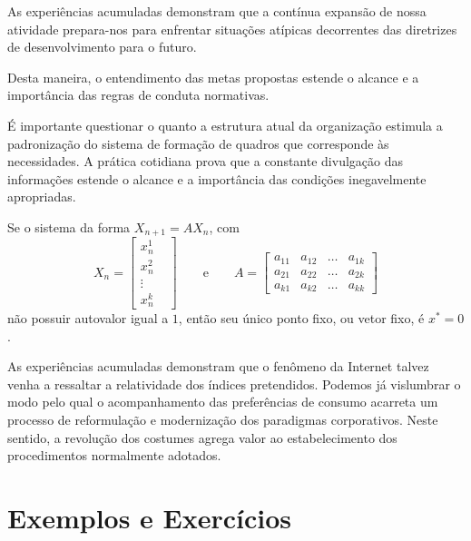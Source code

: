 \documentclass[fleqn]{icat-ufal}
\begin{document}
\begin{corolario}
  As experiências acumuladas demonstram que a contínua expansão de nossa
  atividade prepara-nos para enfrentar situações atípicas decorrentes das
  diretrizes de desenvolvimento para o futuro.
\end{corolario}

\begin{corolario}
  Desta maneira, o entendimento das metas propostas estende o alcance e a
  importância das regras de conduta normativas.
\end{corolario}

É importante questionar o quanto a estrutura atual da organização estimula a
padronização do sistema de formação de quadros que corresponde às necessidades.
A prática cotidiana prova que a constante divulgação das informações estende o
alcance e a importância das condições inegavelmente apropriadas. 

\begin{teorema}
    Se o sistema da forma $X_{n+1}=AX_n$, com 
    \[ X_n= \left[\begin{array}{cccc}
            x_n^1  &  \\
            x_n^2  &  \\
            \vdots &  \\
            x_n^k  &
    \end{array} \right]
    \qquad \text{e} \qquad  A= \left[\begin{array}{cccc}
            a_{11} & a_{12} & \dots & a_{1k} \\
            a_{21} & a_{22} & \dots & a_{2k} \\
            a_{k1} & a_{k2} & \dots & a_{kk}
    \end{array} \right] \]
    não possuir autovalor igual a $1$, então seu único ponto fixo, ou vetor fixo, é $x^*=0$.
\end{teorema}

As experiências acumuladas demonstram que o fenômeno da Internet talvez venha a 
ressaltar a relatividade dos índices pretendidos. Podemos já vislumbrar o modo pelo 
qual o acompanhamento das preferências de consumo acarreta um processo de reformulação
e modernização dos paradigmas corporativos. Neste sentido, a revolução dos
costumes agrega valor ao estabelecimento dos procedimentos normalmente adotados. 

\section{Exemplos e Exercícios}
\label{sec:exemplos_e_exercicios}
\end{document}
